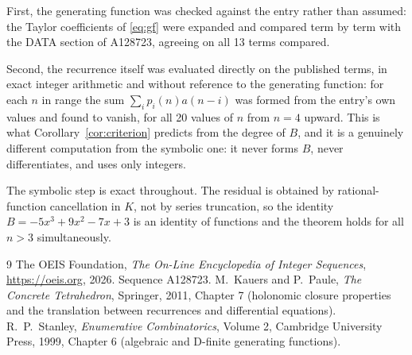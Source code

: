 \documentclass[11pt,a4paper]{article}
\theoremstyle{plain}
\theoremstyle{definition}
\begin{document}
First, the generating function was checked against the entry rather than assumed: the
Taylor coefficients of \eqref{eq:gf} were expanded and compared term by term with the DATA
section of A128723, agreeing on all 13 terms compared.

Second, the recurrence itself was evaluated directly on the published terms, in exact
integer arithmetic and without reference to the generating function: for each $n$ in range
the sum $\sum_{i}p_{i}(n)a(n-i)$ was formed from the entry's own values and found to
vanish, for all 20 values of $n$ from $n=4$ upward. This is what
Corollary~\ref{cor:criterion} predicts from the degree of $B$, and it is a genuinely
different computation from the symbolic one: it never forms $B$, never differentiates, and
uses only integers.

The symbolic step is exact throughout. The residual is obtained by rational-function
cancellation in $K$, not by series truncation, so the identity $B=- 5 x^{3} + 9 x^{2} - 7 x + 3$ is an
identity of functions and the theorem holds for all $n>3$ simultaneously.

\begin{thebibliography}{9}
 The OEIS Foundation, \emph{The On-Line Encyclopedia of Integer Sequences},
\url{https://oeis.org}, 2026. Sequence A128723.
 M.~Kauers and P.~Paule, \emph{The Concrete Tetrahedron}, Springer, 2011,
Chapter 7 (holonomic closure properties and the translation between recurrences and
differential equations).
 R.~P.~Stanley, \emph{Enumerative Combinatorics}, Volume 2, Cambridge
University Press, 1999, Chapter 6 (algebraic and D-finite generating functions).
\end{thebibliography}
\end{document}
